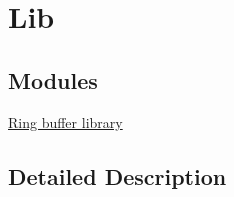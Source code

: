 \hypertarget{group__lib}{\section{Lib}
\label{group__lib}
}
\subsection*{Modules}
\begin{DoxyCompactItemize}
\item 
\hyperlink{group__ringbuf}{Ring buffer library}
\end{DoxyCompactItemize}


\subsection{Detailed Description}
